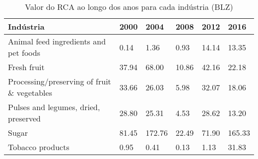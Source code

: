 \begin{table}
\centering
\caption{Valor do RCA ao longo dos anos para cada indústria (BLZ)}
\label{tab:ex3-tempo-BLZ}
\begin{tabular}{p{6cm}p{1.5cm}p{1.5cm}p{1.5cm}p{1.5cm}p{1.5cm}}
\toprule
                                  Indústria &  2000 &   2004 &  2008 &  2012 &   2016 \\
\midrule
      Animal feed ingredients and pet foods &  0.14 &   1.36 &  0.93 & 14.14 &  13.35 \\
                                Fresh fruit & 37.94 &  68.00 & 10.86 & 42.16 &  22.18 \\
Processing/preserving of fruit \& vegetables & 33.66 &  26.03 &  5.98 & 32.07 &  18.06 \\
       Pulses and legumes, dried, preserved & 28.80 &  25.31 &  4.53 & 28.62 &  13.20 \\
                                      Sugar & 81.45 & 172.76 & 22.49 & 71.90 & 165.33 \\
                           Tobacco products &  0.95 &   0.41 &  0.13 &  1.13 &  31.83 \\
\bottomrule
\end{tabular}
\end{table}
